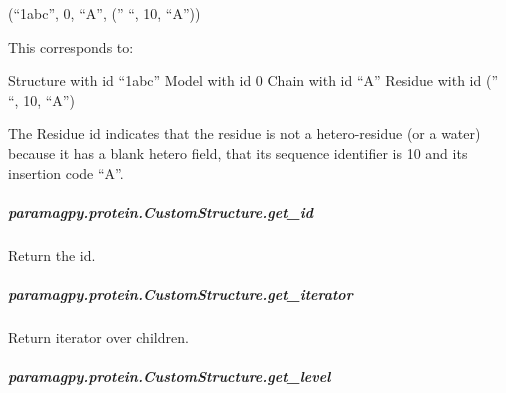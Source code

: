 \documentclass[a4paper,10pt,english,openany,oneside]{sphinxmanual}
\begin{document}
\begin{fulllineitems}
\begin{fulllineitems}
\begin{fulllineitems}
(“1abc”, 0, “A”, (” “, 10, “A”))

This corresponds to:

Structure with id “1abc”
Model with id 0
Chain with id “A”
Residue with id (” “, 10, “A”)

The Residue id indicates that the residue is not a hetero-residue
(or a water) because it has a blank hetero field, that its sequence
identifier is 10 and its insertion code “A”.

\end{fulllineitems}



\subparagraph{paramagpy.protein.CustomStructure.get\_id}
\label{\detokenize{reference/generated/paramagpy.protein.CustomStructure.get_id:paramagpy-protein-customstructure-get-id}}\label{\detokenize{reference/generated/paramagpy.protein.CustomStructure.get_id::doc}}

\begin{fulllineitems}
\label{\detokenize{reference/generated/paramagpy.protein.CustomStructure.get_id:paramagpy.protein.CustomStructure.get_id}}
Return the id.

\end{fulllineitems}



\subparagraph{paramagpy.protein.CustomStructure.get\_iterator}
\label{\detokenize{reference/generated/paramagpy.protein.CustomStructure.get_iterator:paramagpy-protein-customstructure-get-iterator}}\label{\detokenize{reference/generated/paramagpy.protein.CustomStructure.get_iterator::doc}}

\begin{fulllineitems}
\label{\detokenize{reference/generated/paramagpy.protein.CustomStructure.get_iterator:paramagpy.protein.CustomStructure.get_iterator}}
Return iterator over children.

\end{fulllineitems}



\subparagraph{paramagpy.protein.CustomStructure.get\_level}
\label{\detokenize{reference/generated/paramagpy.protein.CustomStructure.get_level:paramagpy-protein-customstructure-get-level}}\label{\detokenize{reference/generated/paramagpy.protein.CustomStructure.get_level::doc}}


\end{fulllineitems}
\end{fulllineitems}
\end{document}
